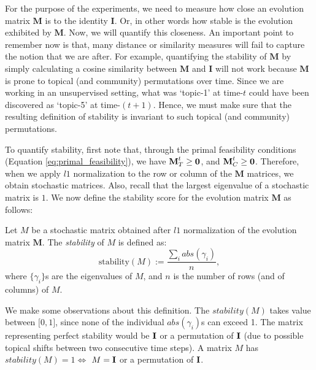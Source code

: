 For the purpose of the experiments, we need to measure how close an evolution matrix 
$\mathbf{M}$ is to the identity $\mathbf{I}$.  Or, in other words how stable is the 
evolution exhibited by $\mathbf{M}$.  Now, we will quantify this closeness.
An important point to remember now is that, many distance or similarity measures will fail to capture
the notion that we are after.  For example, quantifying the stability of $\mathbf{M}$ by simply 
calculating a cosine similarity between $\mathbf{M}$ and $\mathbf{I}$ will not work because $\mathbf{M}$
is prone to topical (and community) permutations over time.  Since we are working in an unsupervised setting,
what was `topic-1' at time-$t$ could have been discovered as `topic-5' at time-$(t+1)$.  Hence, we must
make sure that the resulting definition of stability is invariant to such topical (and community) permutations.

To quantify stability, first note that, through the primal feasibility conditions (Equation \ref{eq:primal_feasibility}), we have
$\textbf{M}^t_T \geq \textbf{0}$, and $\textbf{M}^t_C \geq \textbf{0}$.  Therefore, when we apply $l1$ normalization to the row or
column of the $\mathbf{M}$ matrices, we obtain stochastic matrices.   Also, recall that the largest eigenvalue 
of a stochastic matrix is $1$.  We now define the stability score for the evolution matrix $\mathbf{M}$ as follows:
\begin{definition}
Let $M$ be a stochastic matrix obtained after $l1$ normalization of the evolution matrix $\mathbf{M}$.  The \emph{stability} of $M$ is defined as:
\begin{equation}
\text{stability}(M) := \frac{\sum_i abs(\gamma_i)}{n},
\end{equation}
where $\{\gamma_i\}$s are the eigenvalues of  $M$, and $n$ is the number of rows (and of columns) of $M$.
\label{defn:stability}
\end{definition}

We make some observations about this definition.  The $stability(M)$ takes value
between $\big[0,1\big]$, since none of the individual $abs(\gamma_i)$s can exceed
1.  The matrix representing perfect 
stability would be $\textbf{I}$ or a permutation of $\textbf{I}$ 
(due to possible topical shifts between two consecutive time steps). 
A matrix $M$ has $stability(M) = 1 \iff$ $M = \textbf{I}$ or a permutation of $\textbf{I}$.  

